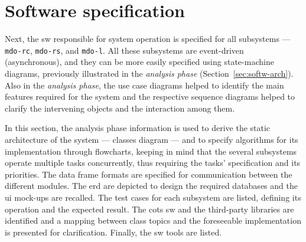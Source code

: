 %
\section{Software specification}
\label{sec:sw-specs}
Next, the \gls{sw} responsible for system operation is specified for all
subsystems --- \texttt{\gls{mdo-rc}}, \texttt{\gls{mdo-rs}}, and
\texttt{mdo-l}.
All these subsystems are event-driven (asynchronous), and they can be more easily
specified using state-machine diagrams, previously illustrated in the
\emph{analysis phase} (Section~\ref{sec:softw-arch}). Also in the \emph{analysis
phase}, the use case diagrams helped to identify the main features required for
the system and the respective sequence diagrams helped to clarify the
intervening objects and the interaction among them.

In this section, the analysis phase information is used to derive the static
architecture of the system --- classes diagram --- and to specify algorithms for
its implementation through flowcharts, keeping in mind that the several
subsystems operate multiple tasks concurrently, thus requiring the tasks'
specification and its priorities. The data frame formats are specified for
communication between the different modules. The \acrfull{erd} are depicted to
design the required databases and the \gls{ui} mock-ups are recalled. The test
cases for each subsystem are listed, defining its operation and the expected
result. The \gls{cots} \gls{sw} and the third-party libraries are identified
and a mapping between class topics and the foreseeable implementation is
presented for clarification. Finally, the \gls{sw} tools are listed.

